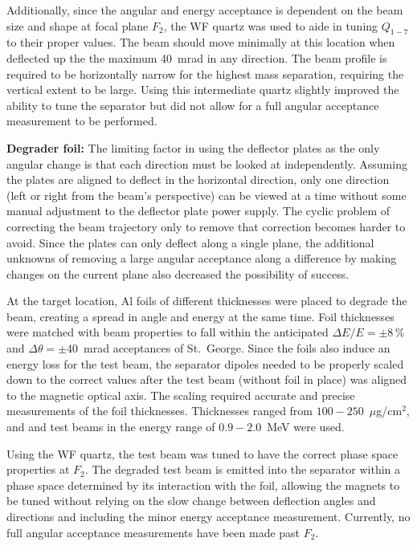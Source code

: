 Additionally, since the angular and energy acceptance is dependent on
the beam size and shape at focal plane $F_2$, the WF quartz was used to
aide in tuning $Q_{1-7}$ to their proper values. The beam should move
minimally at this location when deflected up the the maximum 40~mrad in
any direction. The beam profile is required to be horizontally narrow
for the highest mass separation, requiring the vertical extent to be
large. Using this intermediate quartz slightly improved the ability to
tune the separator but did not allow for a full angular acceptance
measurement to be performed.

\textbf{Degrader foil:}
The limiting factor in using the deflector plates as the only angular
change is that each direction must be looked at independently. Assuming
the plates are aligned to deflect in the horizontal direction, only one
direction (left or right from the beam's perspective) can be viewed at a
time without some manual adjustment to the deflector plate power supply.
The cyclic problem of correcting the beam trajectory only to remove that
correction becomes harder to avoid. Since the plates can only deflect
along a single plane, the additional unknowns of removing a large
angular acceptance along a difference by making changes on the current
plane also decreased the possibility of success.

At the target location, Al foils of different thicknesses were placed to
degrade the beam, creating a spread in angle and energy at the same
time. Foil thicknesses were matched with beam properties to fall within
the anticipated $\Delta E/E = \pm 8$\,\% and $\Delta\theta = \pm
40$~mrad acceptances of St.\ George. Since the foils also induce an
energy loss for the test beam, the separator dipoles needed to be
properly scaled down to the correct values after the test beam (without
foil in place) was aligned to the magnetic optical axis. The scaling
required accurate and precise measurements of the foil thicknesses.
Thicknesses ranged from $100-250$~$\mu$g/cm$^2$, and  and
 test beams in the energy range of $0.9-2.0$~MeV were used.

Using the WF quartz, the test beam was tuned to have the correct phase
space properties at $F_2$. The degraded test beam is emitted into the
separator within a phase space determined by its interaction with the
foil, allowing the magnets to be tuned without relying on the slow
change between deflection angles and directions and including the minor
energy acceptance measurement. Currently, no full angular acceptance
measurements have been made past $F_2$.


